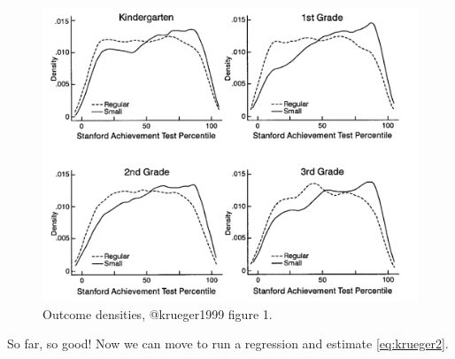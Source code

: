 \documentclass[]{book}
\begin{document}
\begin{figure}
\includegraphics[width=26.03in]{images/krueger1} \caption{Outcome densities, @krueger1999 figure 1.}\label{fig:kruegerdens}
\end{figure}

So far, so good! Now we can move to run a regression and estimate
\eqref{eq:krueger2}.
\end{document}
